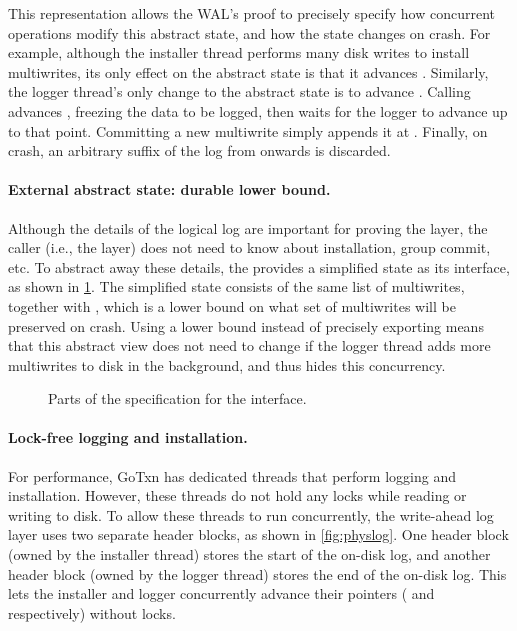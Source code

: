 This representation allows the WAL's proof to precisely specify how concurrent
operations modify this abstract state, and how the state changes on crash.
For example, although the installer thread performs many disk writes to
install multiwrites, its only effect on the abstract state is that it
advances .  Similarly, the logger thread's only change to
the abstract state is to advance .  Calling 
advances , freezing the data to be logged, then waits
for the logger to advance  up to that point.  Committing a
new multiwrite simply appends it at .  Finally, on crash,
an arbitrary suffix of the log from  onwards is discarded.


\paragraph{External abstract state: durable lower bound.}
Although the details of the logical log are important for proving the
 layer, the caller (i.e., the  layer) does not need
to know about installation, group commit, etc. To abstract away these
details, the  provides a simplified state as its interface,
as shown in \cref{fig:wal-spec}.  The simplified state consists of
the same list of multiwrites, together with , which is
a lower bound on what set of multiwrites will be preserved on crash.
Using a lower bound instead of precisely exporting  means
that this abstract view does not need to change if the logger thread
adds more multiwrites to disk in the background, and thus hides
this concurrency.

\begin{figure}[ht]

\vspace{-\baselineskip}
\caption{Parts of the specification for the  interface.}
\label{fig:wal-spec}
\end{figure}


\paragraph{Lock-free logging and installation.}
For performance, GoTxn has dedicated threads that perform logging and
installation.  However, these threads do not hold any locks while reading
or writing to disk.  To allow these threads to run concurrently, the write-ahead
log layer
uses two separate header blocks, as shown in \cref{fig:physlog}.
One header block (owned by the installer thread) stores the start of
the on-disk log, and another header block (owned by the logger thread)
stores the end of the on-disk log.  This lets the installer and logger
concurrently advance their pointers ( and 
respectively) without locks.

